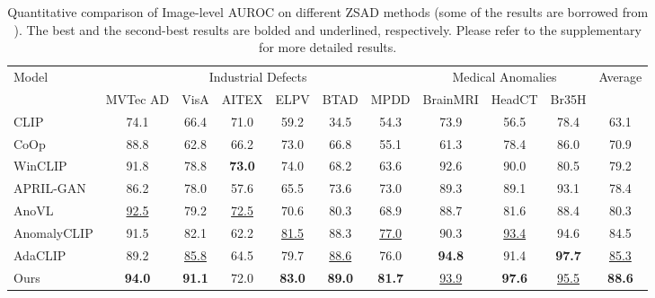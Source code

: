 \begin{table*}
\small
\centering
\begin{tabular}{lcccccccccc}
\toprule
\multicolumn{1}{l}{\multirow{2}{*}{Model}} & \multicolumn{6}{c}{Industrial Defects} & \multicolumn{3}{c}{Medical Anomalies} & \multicolumn{1}{c}{\multirow{2}{*}{Average}}  \\ 
\cmidrule(lr){2-7}\cmidrule(lr){8-10}
\multicolumn{1}{c}{}             & MVTec AD           & VisA & AITEX & ELPV & BTAD & MPDD & BrainMRI          & HeadCT & Br35H &  \multicolumn{1}{c}{}       \\
\hline
CLIP \cite{clip}        & 74.1               & 66.4 & 71.0  & 59.2 & 34.5 & 54.3 & 73.9              & 56.5   & 78.4  & 63.1    \\
CoOp \cite{coop}       & 88.8               & 62.8 & 66.2  & 73.0 & 66.8 & 55.1 & 61.3              & 78.4   & 86.0  & 70.9    \\
WinCLIP \cite{jeong2023winclip}     & 91.8               & 78.8 & \textbf{73.0}  & 74.0 & 68.2 & 63.6 & 92.6              & 90.0   & 80.5  & 79.2    \\
APRIL-GAN \cite{april-gan}  & 86.2               & 78.0 & 57.6  & 65.5 & 73.6 & 73.0 & 89.3              & 89.1   & 93.1  & 78.4    \\
AnoVL \cite{deng2023anovl}       & \underline{92.5}               & 79.2 & \underline{72.5}  & 70.6 & 80.3 & 68.9 & 88.7              & 81.6   & 88.4  & 80.3    \\
AnomalyCLIP \cite{zhou2024anomalyclip} & 91.5               & 82.1 & 62.2  & \underline{81.5} & 88.3 & \underline{77.0} & 90.3              & \underline{93.4}   & 94.6  & 84.5    \\
AdaCLIP \cite{cao2025adaclip}    & 89.2               & \underline{85.8} & 64.5  & 79.7 & \underline{88.6} & 76.0 & \textbf{94.8}              & 91.4   & \textbf{97.7}  & \underline{85.3}    \\
Ours  & \textbf{94.0}      & \textbf{91.1} & 72.0  & \textbf{83.0} & \textbf{89.0} & \textbf{81.7} & \underline{93.9}              & \textbf{97.6}   & \underline{95.5}  & \textbf{88.6}    \\
\bottomrule
\end{tabular}
\caption{Quantitative comparison of Image-level AUROC on different ZSAD methods (some of the results are borrowed from \cite{zhou2024anomalyclip, cao2025adaclip, zhu2024finegrainedabnormalitypromptlearning}). The best and the second-best results are bolded and underlined, respectively. Please refer to the supplementary for more detailed results.}
\label{Tab:1}
\vspace{-3mm}
\end{table*}